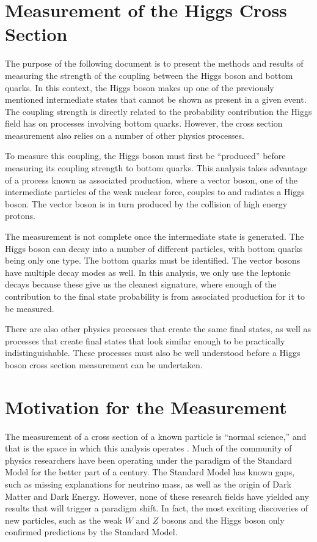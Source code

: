 \section{Measurement of the Higgs Cross Section}

The purpose of the following document is to present the methods and results
of measuring the strength of the coupling between the Higgs boson and bottom quarks.
In this context, the Higgs boson makes up one of the previously mentioned
intermediate states that cannot be shown as present in a given event.
The coupling strength is directly related to the probability contribution
the Higgs field has on processes involving bottom quarks.
However, the cross section measurement also relies on a number of other physics processes.

To measure this coupling, the Higgs boson must first be ``produced''
before measuring its coupling strength to bottom quarks.
This analysis takes advantage of a process known as associated production,
where a vector boson, one of the intermediate particles of the weak nuclear force,
couples to and radiates a Higgs boson.
The vector boson is in turn produced by the collision of high energy protons.

The measurement is not complete once the intermediate state is generated.
The Higgs boson can decay into a number of different particles,
with bottom quarks being only one type.
The bottom quarks must be identified.
The vector bosons have multiple decay modes as well.
In this analysis, we only use the leptonic decays because
these give us the cleanest signature,
where enough of the contribution to the final state probability
is from associated production for it to be measured.

There are also other physics processes that create the same final states,
as well as processes that create final states that look similar enough
to be practically indistinguishable.
These processes must also be well understood before a Higgs boson cross section measurement
can be undertaken.

\section{Motivation for the Measurement}

The measurement of a cross section of a known particle is ``normal science,''
and that is the space in which this analysis operates \cite{Kuhn:1970}.
Much of the community of physics researchers have been operating under the paradigm
of the Standard Model for the better part of a century.
The Standard Model has known gaps,
such as missing explanations for neutrino mass,
as well as the origin of Dark Matter and Dark Energy.
However, none of these research fields have yielded any results
that will trigger a paradigm shift.
In fact, the most exciting discoveries of new particles,
such as the weak $W$ \cite{PhysRevLett.50.1738} and $Z$ \cite{dau1983ua1}
bosons and the Higgs boson \cite{Chatrchyan_2012,PhysRevD.86.032003} only confirmed
predictions by the Standard Model.

